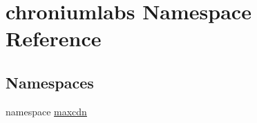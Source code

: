 \hypertarget{namespacechroniumlabs}{
\section{chroniumlabs Namespace Reference}
\label{namespacechroniumlabs}
}
\subsection*{Namespaces}
\begin{DoxyCompactItemize}
\item 
namespace \hyperlink{namespacechroniumlabs_1_1maxcdn}{maxcdn}
\end{DoxyCompactItemize}
